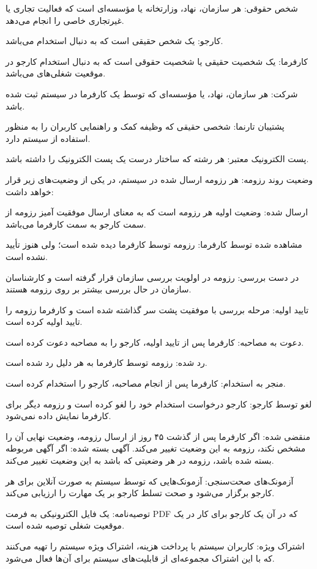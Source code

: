 \documentclass[12pt]{article}
\begin{document}
		شخص حقوقی: هر سازمان، نهاد، وزارتخانه یا مؤسسه‌ای است که فعالیت تجاری یا غیر‌تجاری خاصی را انجام می‌دهد.

		کارجو: یک شخص حقیقی است که به دنبال استخدام می‌باشد.

		کارفرما: یک شخصیت حقیقی یا شخصیت حقوقی است که به دنبال استخدام کارجو در موقعیت شغلی‌های  می‌باشد.

		شرکت: هر سازمان، نهاد، یا مو‌ٔسسه‌ای که توسط یک کارفرما در سیستم ثبت شده باشد.

		پشتیبان تارنما: شخصی حقیقی که وظیفه کمک و راهنمایی کاربران را به منظور استفاده از سیستم دارد.

		پست الکترونیک معتبر: هر رشته که ساختار درست یک پست الکترونیک را داشته باشد.

		وضعیت روند رزومه: هر رزومه ارسال شده در سیستم، در یکی از وضعیت‌های زیر قرار خواهد داشت:

		ارسال شده: وضعیت اولیه هر رزومه است که به معنای ارسال موفقیت آمیز رزومه از سمت کارجو به سمت کارفرما می‌باشد.

		‌مشاهده شده توسط کارفرما: رزومه توسط کارفرما دیده شده است؛ ولی هنوز تأیید نشده است.

		در دست بررسی: رزومه در اولویت بررسی سازمان قرار گرفته است و کارشناسان سازمان در حال بررسی بیشتر بر روی رزومه هستند.

		تایید اولیه: مرحله بررسی با موفقیت پشت سر گذاشته شده است و کارفرما رزومه را تایید اولیه کرده است.

		دعوت به مصاحبه: کارفرما پس از تایید اولیه، کارجو را به مصاحبه دعوت کرده است.

		رد شده: رزومه توسط کارفرما به هر دلیل رد شده است.

		منجر به استخدام: کارفرما پس از انجام مصاحبه، کارجو را استخدام کرده است.

		لغو توسط کارجو: کارجو درخواست استخدام خود را لغو کرده است و رزومه دیگر برای کارفرما نمایش داده نمی‌شود.

		منقضی شده: اگر کارفرما پس از گذشت ۴۵ روز از ارسال رزومه،‌ وضعیت نهایی آن را مشخص نکند، رزومه به این وضعیت تغییر می‌کند.
		آگهی بسته شده: اگر آگهی مربوطه بسته شده باشد، رزومه در هر وضعیتی که باشد به این وضعیت تغییر می‌کند.

		آزمونک‌های صحت‌سنجی: آزمونک‌هایی که توسط سیستم به صورت آنلاین برای هر کارجو برگزار می‌شود و صحت تسلط کارجو بر یک مهارت را ارزیابی می‌کند.

		توصیه‌نامه: یک فایل الکترونیکی به فرمت PDF که در آن یک کارجو برای کار در یک موقعیت شغلی توصیه شده است.

		اشتراک ویژه: کاربران سیستم با پرداخت هزینه‌‌‌، اشتراک ویژه سیستم را تهیه می‌کنند که با این اشتراک مجموعه‌ای از قابلیت‌های سیستم برای آن‌ها فعال می‌شود.
\end{document}
